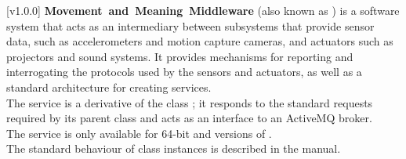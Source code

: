 [v1.0.0]
\textbf{Movement~and~Meaning~Middleware} (also known as \mplusm) is a software system
that acts as an intermediary between subsystems that provide sensor data, such as
accelerometers and motion capture cameras, and actuators such as projectors and sound
systems.
It provides mechanisms for reporting and interrogating the protocols used by the sensors
and actuators, as well as a standard architecture for creating services.\\

The \SMO{} service is a derivative of the \mplusm{} class ;
it responds to the standard requests required by its parent class and acts as an interface
to an ActiveMQ broker.\\

The \SMO{} service is only available for \win{} 64-bit and \osx{} versions of \mplusm.\\

The standard behaviour of  class instances is described in
the \emph{\MMM} manual.
\primaryEnd{}
